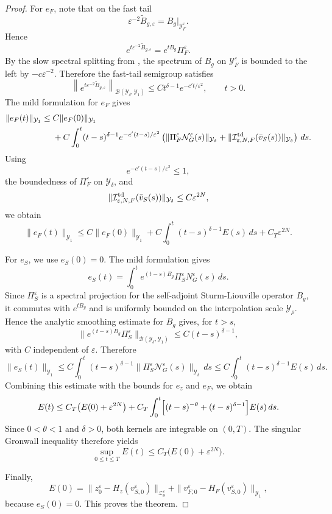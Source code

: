 \documentclass[11pt]{article}
\theoremstyle{definition}
\theoremstyle{remark}
\numberwithin{equation}{section}
\newcommand{\mc}[1]{\mathcal{#1}}
\begin{document}
\begin{proof}
For \(e_F\), note that on the fast tail
\[
\varepsilon^{-2}\widetilde B_{g,\varepsilon}
=
B_g|_{\mathcal Y_F^\varepsilon}.
\]
Hence
\[
e^{t\varepsilon^{-2}\widetilde B_{g,\varepsilon}}
=
e^{tB_g}\Pi_F^\varepsilon .
\]
By the slow spectral splitting from , the spectrum of
\(B_g\) on \(\mathcal Y_F^\varepsilon\) is bounded to the left by
\(-c\varepsilon^{-2}\).
Therefore the fast-tail semigroup satisfies
\[
\left\|
e^{t\varepsilon^{-2}\widetilde B_{g,\varepsilon}}
\right\|_{\mathcal B(\mathcal Y_\delta,\mathcal Y_1)}
\le
Ct^{\delta-1}e^{-c't/\varepsilon^2},
\qquad t>0.
\]
The mild formulation for \(e_F\) gives
\[
\begin{aligned}
\|e_F(t)\|_{\mathcal Y_1}
\le{}&
C\|e_F(0)\|_{\mathcal Y_1}
\\
&+
C\int_0^t
(t-s)^{\delta-1}e^{-c'(t-s)/\varepsilon^2}
\left(
\|\Pi_F^\varepsilon\mathcal N_G^\varepsilon(s)\|_{\mathcal Y_\delta}
+
\|\mathcal I_{\varepsilon,N,F}^{\rm td}(\bar v_S(s))\|_{\mathcal Y_\delta}
\right)\,ds .
\end{aligned}
\]
Using
\[
e^{-c'(t-s)/\varepsilon^2}\le1,
\]
the boundedness of \(\Pi_F^\varepsilon\) on \(\mathcal Y_\delta\), and
\[
\|\mathcal I_{\varepsilon,N,F}^{\rm td}(\bar v_S(s))\|_{\mathcal Y_\delta}
\le
C\varepsilon^{2N},
\]
we obtain
\[
\|e_F(t)\|_{\mathcal Y_1}
\le
C\|e_F(0)\|_{\mathcal Y_1}
+
C\int_0^t
(t-s)^{\delta-1}E(s)\,ds
+
C_T\varepsilon^{2N}.
\]

For \(e_S\), we use \(e_S(0)=0\). The mild formulation gives
\[
  e_S(t)
  =
  \int_0^t
  e^{(t-s)B_g}\Pi_S^\varepsilon N_G^\varepsilon(s)\,ds .
\]
Since \(\Pi_S^\varepsilon\) is a spectral projection for the self-adjoint Sturm-Liouville operator \(B_g\), it commutes with \(e^{tB_g}\) and is uniformly bounded on the interpolation scale \(\mc Y_\rho\). 
Hence the analytic smoothing estimate for \(B_g\) gives, for \(t>s\),
\[
  \bigl\|
    e^{(t-s)B_g}\Pi_S^\varepsilon
  \bigr\|_{\mathcal B(\mc Y_\delta,\mc Y_1)}
  \le
  C(t-s)^{\delta-1},
\]
with \(C\) independent of \(\varepsilon\). Therefore
\[
  \|e_S(t)\|_{\mc Y_1}
  \le
  C\int_0^t
  (t-s)^{\delta-1}
  \|\Pi_S^\varepsilon \mc N_G^\varepsilon(s)\|_{\mc Y_\delta}\,ds
  \le
  C\int_0^t
  (t-s)^{\delta-1}E(s)\,ds .
\]
Combining this estimate with the bounds for \(e_z\) and \(e_F\), we obtain
\[
  E(t)
  \le
  C_T\bigl(E(0)+\varepsilon^{2N}\bigr)
  +
  C_T\int_0^t
  \Bigl[(t-s)^{-\theta}+(t-s)^{\delta-1}\Bigr]E(s)\,ds .
\]
Since \(0<\theta<1\) and \(\delta>0\), both kernels are integrable on \((0,T)\). 
The singular Gronwall inequality \cite[Lemma~7.1.1]{Henry1981}
therefore yields
\[
  \sup_{0\le t\le T}E(t)
  \le
  C_T\bigl(E(0)+\varepsilon^{2N}\bigr).
\]

Finally,
\[
E(0)
=
\|z_0^\varepsilon-H_z(v_{S,0}^\varepsilon)\|_{\mathcal Z_\theta^\varepsilon}
+
\|v_{F,0}^\varepsilon-H_F(v_{S,0}^\varepsilon)\|_{\mathcal Y_1},
\]
because \(e_S(0)=0\). This proves the theorem.
\end{proof}
\end{document}
